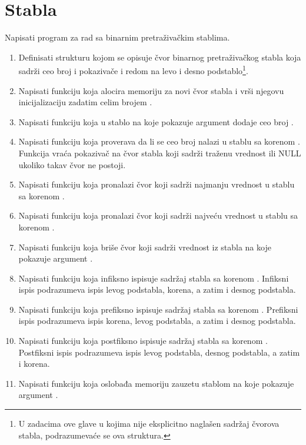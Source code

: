 \section{Stabla}

\begin{Exercise}[label=701]
Napisati program za rad sa binarnim pretraživačkim stablima.
\begin{enumerate}
\item Definisati strukturu  kojom se opisuje čvor binarnog pretraživačkog stabla koja sadrži ceo broj  i pokazivače  i  redom na levo i desno podstablo\footnote{U zadacima ove glave u kojima nije eksplicitno naglašen sadržaj čvorova stabla, podrazumevaće se ova struktura.}.
\item Napisati funkciju  koja alocira memoriju za novi čvor stabla i vrši njegovu inicijalizaciju zadatim celim brojem .
\item Napisati funkciju  koja u stablo na koje pokazuje argument  dodaje ceo broj .
\item Napisati funkciju  koja proverava da li se ceo broj  nalazi u stablu sa korenom . Funkcija vraća pokazivač na čvor stabla koji sadrži traženu vrednost ili NULL ukoliko takav čvor ne postoji.
\item Napisati funkciju  koja pronalazi čvor koji sadrži najmanju vrednost u stablu sa korenom .
\item Napisati funkciju  koja pronalazi čvor koji sadrži najveću vrednost u stablu sa korenom .
\item Napisati funkciju  koja briše čvor koji sadrži vrednost  iz stabla na koje pokazuje argument .
\item Napisati funkciju  koja infiksno ispisuje sadržaj stabla sa korenom . Infiksni ispis podrazumeva ispis levog podstabla, korena, a zatim i desnog podstabla.
\item Napisati funkciju  koja prefiksno ispisuje sadržaj stabla sa korenom . Prefiksni ispis podrazumeva ispis korena, levog podstabla, a zatim i desnog podstabla.
\item Napisati funkciju  koja postfiksno ispisuje sadržaj stabla sa korenom . Postfiksni ispis podrazumeva ispis levog podstabla, desnog podstabla, a zatim i korena.
\item Napisati funkciju  koja oslobađa memoriju zauzetu stablom na koje pokazuje argument .
\end{enumerate}


\end{Exercise}
